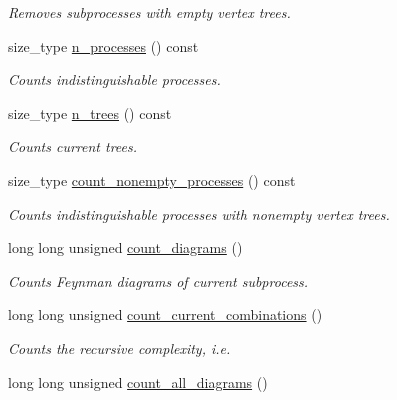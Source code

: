 \begin{DoxyCompactItemize}
\begin{DoxyCompactList}\small\item\em Removes subprocesses with empty vertex trees. \end{DoxyCompactList}\item 
\hypertarget{a00070_ac92fd247115dfa053bf7190c3fd50500}{size\-\_\-type \hyperlink{a00070_ac92fd247115dfa053bf7190c3fd50500}{n\-\_\-processes} () const }\label{a00070_ac92fd247115dfa053bf7190c3fd50500}

\begin{DoxyCompactList}\small\item\em Counts indistinguishable processes. \end{DoxyCompactList}\item 
\hypertarget{a00070_a9e25911d426e3427b3aa6737e526d2a1}{size\-\_\-type \hyperlink{a00070_a9e25911d426e3427b3aa6737e526d2a1}{n\-\_\-trees} () const }\label{a00070_a9e25911d426e3427b3aa6737e526d2a1}

\begin{DoxyCompactList}\small\item\em Counts current trees. \end{DoxyCompactList}\item 
\hypertarget{a00070_af7dd450ae8de745dba9770e047fdafe0}{size\-\_\-type \hyperlink{a00070_af7dd450ae8de745dba9770e047fdafe0}{count\-\_\-nonempty\-\_\-processes} () const }\label{a00070_af7dd450ae8de745dba9770e047fdafe0}

\begin{DoxyCompactList}\small\item\em Counts indistinguishable processes with nonempty vertex trees. \end{DoxyCompactList}\item 
\hypertarget{a00070_ab4219712736358f6de47885b29d706f7}{long long unsigned \hyperlink{a00070_ab4219712736358f6de47885b29d706f7}{count\-\_\-diagrams} ()}\label{a00070_ab4219712736358f6de47885b29d706f7}

\begin{DoxyCompactList}\small\item\em Counts Feynman diagrams of current subprocess. \end{DoxyCompactList}\item 
long long unsigned \hyperlink{a00070_a3f7fba8482b0038466cf79ffe3331a00}{count\-\_\-current\-\_\-combinations} ()
\begin{DoxyCompactList}\small\item\em Counts the recursive complexity, i.\-e. \end{DoxyCompactList}\item 
\hypertarget{a00070_a1e2be5beaaa4a7959dc7576d9a15c393}{long long unsigned \hyperlink{a00070_a1e2be5beaaa4a7959dc7576d9a15c393}{count\-\_\-all\-\_\-diagrams} ()}\label{a00070_a1e2be5beaaa4a7959dc7576d9a15c393}


\end{DoxyCompactItemize}
